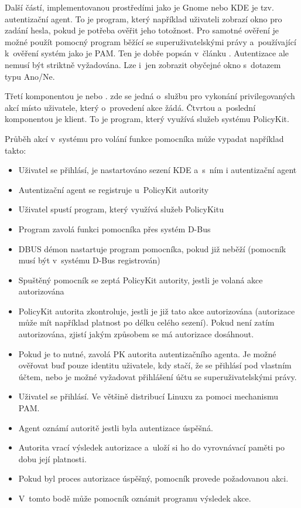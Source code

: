 Další částí, implementovanou prostředími jako je Gnome nebo KDE je tzv. autentizační agent. To je program, který například uživateli zobrazí okno pro zadání hesla, pokud je potřeba ověřit jeho totožnost. Pro samotné ověření je možné použít pomocný program běžící se superuživatelskými právy a~používající k~ověření systém jako je PAM. Ten je dobře popsán v~článku \cite{rootpam}. Autentizace ale nemusí být striktně vyžadována. Lze i~jen zobrazit obyčejné okno s~dotazem typu Ano/Ne.

Třetí komponentou je  nebo . zde se jedná o~službu pro vykonání privilegovaných akcí místo uživatele, který o~provedení akce žádá. Čtvrtou a~poslední komponentou je klient. To je program, který využívá služeb systému PolicyKit.



Průběh akcí v~systému pro volání funkce pomocníka může vypadat například takto:
\begin{itemize}
\item Uživatel se přihlásí, je nastartováno sezení KDE a~s~ním i autentizační agent
\item Autentizační agent se registruje u~PolicyKit autority
\item Uživatel spustí program, který využívá služeb PolicyKitu
\item Program zavolá funkci pomocníka přes systém D-Bus
\item DBUS démon nastartuje program pomocníka, pokud již neběží (pomocník musí být v~systému D-Bus registrován)
\item Spuštěný pomocník se zeptá PolicyKit autority, jestli je volaná akce autorizována
\item PolicyKit autorita zkontroluje, jestli je již tato akce autorizována (autorizace může mít například platnost po délku celého sezení). Pokud není zatím autorizována, zjistí jakým způsobem se má autorizace dosáhnout.
\item Pokud je to nutné, zavolá PK autorita autentizačního agenta. Je možné ověřovat buď pouze identitu uživatele, kdy stačí, že se přihlásí pod vlastním účtem, nebo je možné vyžadovat přihlášení účtu se superuživatelskými právy.
\item Uživatel se přihlásí. Ve většině distribucí Linuxu za pomoci mechanismu PAM.
\item Agent oznámí autoritě jestli byla autentizace úspěšná.
\item Autorita vrací výsledek autorizace a~uloží si ho do vyrovnávací paměti po dobu její platnosti.
\item Pokud byl proces autorizace úspěšný, pomocník provede požadovanou akci.
\item V~tomto bodě může pomocník oznámit programu výsledek akce.
\end{itemize}

